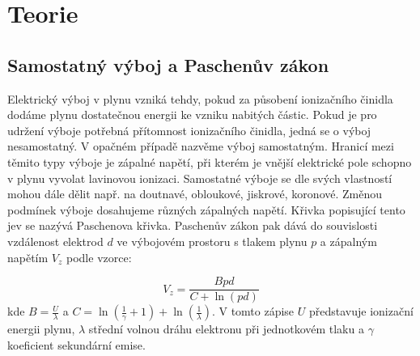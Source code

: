 \documentclass{protokol}
\begin{document}
\header

\section{Teorie}
\subsection{Samostatný výboj a Paschenův zákon}

Elektrický výboj v plynu vzniká tehdy, pokud za působení ionizačního
činidla dodáme plynu dostatečnou energii ke vzniku nabitých částic.
Pokud je pro udržení výboje potřebná přítomnost ionizačního činidla,
jedná se o výboj nesamostatný. V opačném případě nazvěme výboj samostatným.
Hranicí mezi těmito typy výboje je zápalné napětí,
při kterém je vnější elektrické pole schopno v plynu vyvolat lavinovou ionizaci.
Samostatné výboje se dle svých vlastností mohou dále dělit např. na doutnavé, obloukové, jiskrové, koronové.
Změnou podmínek výboje dosahujeme různých zápalných napětí.
Křivka popisující tento jev se nazývá Paschenova křivka.
Paschenův zákon pak dává do souvislosti vzdálenost elektrod $d$ ve výbojovém prostoru
s tlakem plynu $p$ a zápalným napětím $V_z$ podle vzorce:

\begin{equation}
V_z = \frac{Bpd}{C+\ln(pd)}
\end{equation}
kde $B=\frac{U}{\lambda}$ a $C= \ln(\frac{1}{\gamma}+1) + \ln(\frac{1}{\lambda})$.
V tomto zápise $U$ představuje ionizační energii plynu,
$\lambda$ střední volnou dráhu elektronu při jednotkovém tlaku
a $\gamma$ koeficient sekundární emise.
\end{document}
